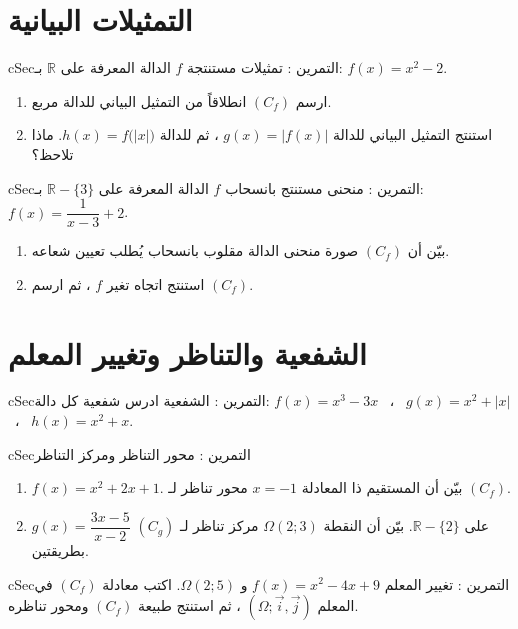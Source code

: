 \documentclass[12pt,a4paper]{article}
\newenvironment{BOX}[2]{\begin{otherlanguage}{english}\begin{arbox}{#1}{#2}}{\end{arbox}\end{otherlanguage}}
\newcounter{exo}
\newenvironment{tamrin}[1]{\stepcounter{exo}\begin{BOX}{cSec}{التمرين \theexo: #1}}{\end{BOX}}
\newcommand{\R}{\mathbb{R}}
\begin{document}
\section{التمثيلات البيانية}
\begin{tamrin}{تمثيلات مستنتجة}
$f$ الدالة المعرفة على $\R$ بـ: $f(x)=x^2-2$.
\begin{enumerate}
\item ارسم $(C_f)$ انطلاقاً من التمثيل البياني للدالة مربع.
\item استنتج التمثيل البياني للدالة $g(x)=|f(x)|$ ، ثم للدالة $h(x)=f\big(|x|\big)$. ماذا تلاحظ؟
\end{enumerate}
\end{tamrin}

\begin{tamrin}{منحنى مستنتج بانسحاب}
$f$ الدالة المعرفة على $\R-\{3\}$ بـ: $f(x)=\dfrac{1}{x-3}+2$.
\begin{enumerate}
\item بيّن أن $(C_f)$ صورة منحنى الدالة مقلوب بانسحاب يُطلب تعيين شعاعه.
\item استنتج اتجاه تغير $f$ ، ثم ارسم $(C_f)$.
\end{enumerate}
\end{tamrin}

\section{الشفعية والتناظر وتغيير المعلم}
\begin{tamrin}{الشفعية}
ادرس شفعية كل دالة: \quad $f(x)=x^3-3x$ \ ، \ $g(x)=x^2+|x|$ \ ، \ $h(x)=x^2+x$.
\end{tamrin}

\begin{tamrin}{محور التناظر ومركز التناظر}
\begin{enumerate}
\item $f(x)=x^2+2x+1$. بيّن أن المستقيم ذا المعادلة $x=-1$ محور تناظر لـ $(C_f)$.
\item $g(x)=\dfrac{3x-5}{x-2}$ على $\R-\{2\}$. بيّن أن النقطة $\Omega(2;3)$ مركز تناظر لـ $(C_g)$ بطريقتين.
\end{enumerate}
\end{tamrin}

\begin{tamrin}{تغيير المعلم}
$f(x)=x^2-4x+9$ و $\Omega(2;5)$. اكتب معادلة $(C_f)$ في المعلم $\left(\Omega;\vec i,\vec j\right)$ ، ثم استنتج طبيعة $(C_f)$ ومحور تناظره.
\end{tamrin}
\end{document}
